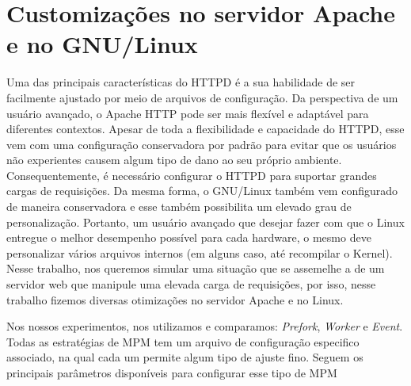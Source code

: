 \section{Customizações no servidor Apache e no GNU/Linux}
\label{sec:customization}

Uma das principais características do HTTPD é a sua habilidade de ser
facilmente ajustado por meio de arquivos de configuração. Da perspectiva de um
usuário avançado, o Apache HTTP pode ser mais flexível e adaptável para
diferentes contextos. Apesar de toda a flexibilidade e capacidade do HTTPD,
esse vem com uma configuração conservadora por padrão para evitar que os
usuários não experientes causem algum tipo de dano ao seu próprio ambiente.
Consequentemente, é necessário configurar o HTTPD para suportar grandes cargas
de requisições. Da mesma forma, o GNU/Linux também vem configurado de maneira
conservadora e esse também possibilita um elevado grau de personalização.
Portanto, um usuário avançado que desejar fazer com que o Linux entregue o
melhor desempenho possível para cada hardware, o mesmo deve personalizar vários
arquivos internos (em alguns caso, até recompilar o Kernel). Nesse trabalho,
nos queremos simular uma situação que se assemelhe a de um servidor web que
manipule uma elevada carga de requisições, por isso, nesse trabalho fizemos
diversas otimizações no servidor Apache e no Linux.

Nos nossos experimentos, nos utilizamos e comparamos: \emph{Prefork},
\emph{Worker} e \emph{Event}. Todas as estratégias de MPM tem um arquivo de
configuração especifico associado, na qual cada um permite algum tipo de ajuste
fino. Seguem os principais parâmetros disponíveis para configurar esse tipo de
MPM 

